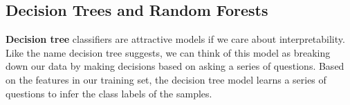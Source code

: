 \documentclass[a4paper,11pt]{article}
\begin{document}
\subsection{Decision Trees and Random Forests}

\textbf{Decision tree} classifiers are attractive models if we care about interpretability. Like the name decision tree suggests, we can think of this model as breaking down our data by making decisions based on asking a series of questions.
Based on the features in our training set, the decision tree model learns a series of questions to infer the class labels of the samples. 

\end{document}
